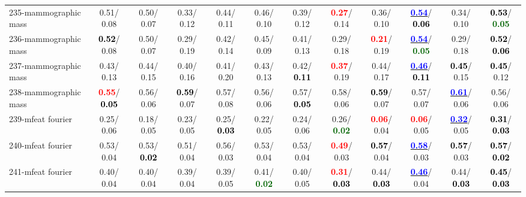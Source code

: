 \begin{table}[h]
\begin{center}
{\begin{tabular}{lc|c|c|c|c|c|c|c|c|c|c}
235-mammographic mass &   0.51/  0.08 &   0.50/  0.07 &   0.33/  0.12 &   0.44/  0.11 &   0.46/  0.10 &   0.39/  0.12 & \textcolor{red}{\textbf{  0.27}}/  0.14 &   0.36/  0.10 & \underline{\textcolor{blue}{\textbf{  0.54}}}/\textcolor{black}{\textbf{  0.06}} &   0.34/  0.10 & \textcolor{black}{\textbf{  0.53}}/\textcolor{darkgreen}{\textbf{  0.05}} \\
236-mammographic mass & \textcolor{black}{\textbf{  0.52}}/  0.08 &   0.50/  0.07 &   0.29/  0.19 &   0.42/  0.14 &   0.45/  0.09 &   0.41/  0.13 &   0.29/  0.18 & \textcolor{red}{\textbf{  0.21}}/  0.19 & \underline{\textcolor{blue}{\textbf{  0.54}}}/\textcolor{darkgreen}{\textbf{  0.05}} &   0.29/  0.18 & \textcolor{black}{\textbf{  0.52}}/\textcolor{black}{\textbf{  0.06}} \\
237-mammographic mass &   0.43/  0.13 &   0.44/  0.15 &   0.40/  0.16 &   0.41/  0.20 &   0.43/  0.13 &   0.42/\textcolor{black}{\textbf{  0.11}} & \textcolor{red}{\textbf{  0.37}}/  0.19 &   0.44/  0.17 & \underline{\textcolor{blue}{\textbf{  0.46}}}/\textcolor{black}{\textbf{  0.11}} & \textcolor{black}{\textbf{  0.45}}/  0.15 & \textcolor{black}{\textbf{  0.45}}/  0.12 \\
238-mammographic mass & \textcolor{red}{\textbf{  0.55}}/\textcolor{black}{\textbf{  0.05}} &   0.56/  0.06 & \textcolor{black}{\textbf{  0.59}}/  0.07 &   0.57/  0.08 &   0.56/  0.06 &   0.57/\textcolor{black}{\textbf{  0.05}} &   0.58/  0.06 & \textcolor{black}{\textbf{  0.59}}/  0.07 &   0.57/  0.07 & \underline{\textcolor{blue}{\textbf{  0.61}}}/  0.06 &   0.56/  0.06 \\ \hline
239-mfeat fourier &   0.25/  0.06 &   0.18/  0.05 &   0.23/  0.05 &   0.25/\textcolor{black}{\textbf{  0.03}} &   0.22/  0.05 &   0.24/  0.06 &   0.26/\textcolor{darkgreen}{\textbf{  0.02}} & \textcolor{red}{\textbf{  0.06}}/  0.04 & \textcolor{red}{\textbf{  0.06}}/  0.05 & \underline{\textcolor{blue}{\textbf{  0.32}}}/  0.05 & \textcolor{black}{\textbf{  0.31}}/\textcolor{black}{\textbf{  0.03}} \\
240-mfeat fourier &   0.53/  0.04 &   0.53/\textcolor{black}{\textbf{  0.02}} &   0.51/  0.04 &   0.56/  0.03 &   0.53/  0.04 &   0.53/  0.04 & \textcolor{red}{\textbf{  0.49}}/  0.03 & \textcolor{black}{\textbf{  0.57}}/  0.04 & \underline{\textcolor{blue}{\textbf{  0.58}}}/  0.03 & \textcolor{black}{\textbf{  0.57}}/  0.03 & \textcolor{black}{\textbf{  0.57}}/\textcolor{black}{\textbf{  0.02}} \\
241-mfeat fourier &   0.40/  0.04 &   0.40/  0.04 &   0.39/  0.04 &   0.39/  0.05 &   0.41/\textcolor{darkgreen}{\textbf{  0.02}} &   0.40/  0.05 & \textcolor{red}{\textbf{  0.31}}/\textcolor{black}{\textbf{  0.03}} &   0.44/\textcolor{black}{\textbf{  0.03}} & \underline{\textcolor{blue}{\textbf{  0.46}}}/  0.04 &   0.44/\textcolor{black}{\textbf{  0.03}} & \textcolor{black}{\textbf{  0.45}}/\textcolor{black}{\textbf{  0.03}} \\

\end{tabular}}
\end{center}
\end{table}
